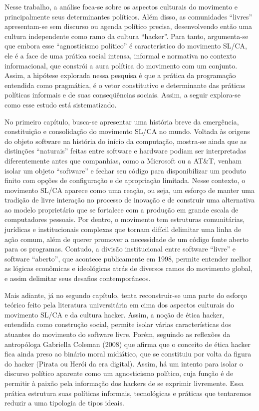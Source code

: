 Nesse trabalho, a análise foca-se sobre os aspectos culturais do movimento e principalmente seus determinantes políticos. Além disso, as comunidades “livres” apresentam-se sem discurso ou agenda político precisa, desenvolvendo então uma cultura independente como ramo da cultura “hacker”. Para tanto, argumenta-se que embora esse “agnosticismo político” é característico do movimento SL/CA, ele é a face de uma prática social intensa, informal e normativa no contexto informacional, que constrói a aura política do movimento com um conjunto. Assim, a hipótese explorada nessa pesquisa é que a prática da programação entendida como pragmática, é o vetor constitutivo e determinante das práticas políticas informais e de suas conseqüências sociais. Assim, a seguir explora-se como esse estudo está sistematizado.

No primeiro capítulo, busca-se apresentar uma história breve da emergência, constituição e consolidação do movimento SL/CA no mundo. Voltada às origens do objeto software na história do início da computação, mostra-se ainda que as distinções “naturais” feitas entre software e hardware podiam ser interpretadas diferentemente antes que companhias, como a Microsoft ou a AT\&T, venham isolar um objeto “software” e fechar seu código para disponibilizar um produto finito com opções de configuração e de apropriação limitada. 
Nesse contexto, o movimento SL/CA aparece como uma reação, ou seja, um esforço de manter uma tradição de livre interação no processo de inovação e de construir uma alternativa ao modelo proprietário que se fortalece com a produção em grande escala de computadores pessoais. Por dentro, o movimento tem estruturas comunitárias, jurídicas e institucionais complexas que tornam difícil delimitar uma linha de ação comum, além de querer promover a necessidade de um código fonte aberto para os programas. Contudo, a divisão institucional entre software “livre” e software “aberto”, que acontece publicamente em 1998, permite entender melhor as lógicas econômicas e ideológicas atrás de diversos ramos do movimento global, e assim delimitar seus desafios contemporâneos.

Mais adiante, já no segundo capítulo, tenta reconstruir-se uma parte do esforço teórico feito pela literatura universitária em cima dos aspectos culturais do movimento SL/CA e da cultura hacker. Assim, a noção de ética hacker, entendida como construção social, permite isolar várias características dos atuantes do movimento do software livre. Porém, seguindo as reflexões da antropóloga Gabriella Coleman (2008) que afirma que o conceito de ética hacker fica ainda preso ao binário moral midiático, que se constituiu por volta da figura do hacker (Pirata ou Herói da era digital). Assim, há um intento para isolar o discurso político aparente como um agnosticismo político, cuja função é de permitir à paixão pela informação dos hackers de se exprimir livremente. Essa prática estrutura suas políticas informais, tecnológicas e práticas que tentaremos reduzir a uma tipologia de tipos ideais.

